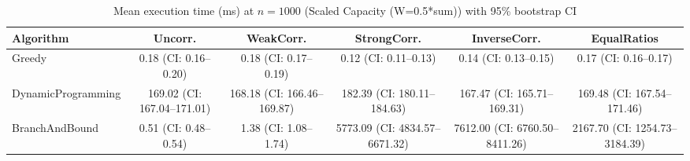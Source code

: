 \begin{table}[tb]
\centering
\caption{Mean execution time (ms) at $n=1000$ (Scaled Capacity (W=0.5*sum)) with 95\% bootstrap CI}
\label{tab:scaled-time-max-n}
\begin{tabular}{lccccc}
\toprule
Algorithm & Uncorr. & WeakCorr. & StrongCorr. & InverseCorr. & EqualRatios \\
\midrule
Greedy & 0.18 (CI: 0.16–0.20) & 0.18 (CI: 0.17–0.19) & 0.12 (CI: 0.11–0.13) & 0.14 (CI: 0.13–0.15) & 0.17 (CI: 0.16–0.17) \\
DynamicProgramming & 169.02 (CI: 167.04–171.01) & 168.18 (CI: 166.46–169.87) & 182.39 (CI: 180.11–184.63) & 167.47 (CI: 165.71–169.31) & 169.48 (CI: 167.54–171.46) \\
BranchAndBound & 0.51 (CI: 0.48–0.54) & 1.38 (CI: 1.08–1.74) & 5773.09 (CI: 4834.57–6671.32) & 7612.00 (CI: 6760.50–8411.26) & 2167.70 (CI: 1254.73–3184.39) \\
\bottomrule
\end{tabular}
\end{table}
